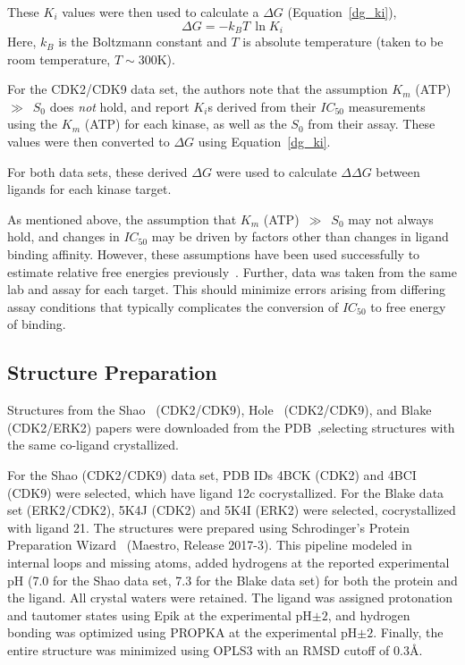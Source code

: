 \documentclass[phd,tocprelim]{cornell}
\begin{document}
These $K_i$ values were then used to calculate a $\Delta G$ (Equation~\ref{dg_ki}),
\begin{equation}\label{dg_ki}
\Delta G = -k_B T \, \ln {K_i}
\end{equation}
Here, $k_B$ is the Boltzmann constant and $T$ is absolute temperature (taken to be room temperature, $T \sim 300$K). 

For the CDK2/CDK9 data set, the authors note that the assumption $K_m$ (ATP)~$\gg$~$S_0$ does \emph{not} hold, and report $K_i$s derived from their $IC_{50}$ measurements using the $K_m$ (ATP) for each kinase, as well as the $S_0$ from their assay. 
These values were then converted to $\Delta G$ using  Equation~\ref{dg_ki}. 

For both data sets, these derived $\Delta G$ were used to calculate $\Delta \Delta G$ between ligands for each kinase target.

As mentioned above, the assumption that $K_m$ (ATP)~$\gg$~$S_0$ may not always hold, and changes in $IC_{50}$ may be driven by factors other than changes in ligand binding affinity. 
However, these assumptions have been used successfully to estimate relative free energies previously~\citep{Hauser:2018vz,Michel:J.Med.Chem.:2006}. 
Further, data was taken from the same lab and assay for each target. 
This should minimize errors arising from differing assay conditions that typically complicates the conversion of $IC_{50}$ to free energy of binding. 

\subsection{Structure Preparation}
Structures from the Shao~\citep{Shao2013-oe} (CDK2/CDK9), Hole~\citep{Hole2013-sr} (CDK2/CDK9), and Blake~\citep{Blake2016-su} (CDK2/ERK2) papers were downloaded from the PDB~\citep{Berman2002-hg},selecting structures with the same co-ligand crystallized. 

For the Shao (CDK2/CDK9) data set, PDB IDs 4BCK (CDK2) and 4BCI (CDK9) were selected, which have ligand 12c cocrystallized. 
For the Blake data set (ERK2/CDK2), 5K4J (CDK2) and 5K4I (ERK2) were selected, cocrystallized with ligand 21. 
The structures were prepared using Schrodinger’s Protein Preparation Wizard~\citep{Sastry2013-ax} (Maestro, Release 2017-3). 
This pipeline modeled in internal loops and missing atoms, added hydrogens at the reported experimental pH (7.0 for the Shao data set, 7.3 for the Blake data set) for both the protein and the ligand. 
All crystal waters were retained. 
The ligand was assigned protonation and tautomer states using Epik at the experimental pH$\pm2$, and hydrogen bonding was optimized using PROPKA at the experimental pH$\pm2$. 
Finally, the entire structure was minimized using OPLS3 with an RMSD cutoff of 0.3\AA.
\end{document}
